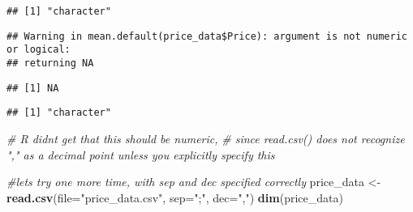 \documentclass[
]{article}
\newenvironment{Shaded}{\begin{snugshade}}{\end{snugshade}}
\newcommand{\AttributeTok}[1]{\textcolor[rgb]{0.13,0.29,0.53}{#1}}
\newcommand{\CommentTok}[1]{\textcolor[rgb]{0.56,0.35,0.01}{\textit{#1}}}
\newcommand{\FunctionTok}[1]{\textcolor[rgb]{0.13,0.29,0.53}{\textbf{#1}}}
\newcommand{\NormalTok}[1]{#1}
\newcommand{\OtherTok}[1]{\textcolor[rgb]{0.56,0.35,0.01}{#1}}
\newcommand{\SpecialCharTok}[1]{\textcolor[rgb]{0.81,0.36,0.00}{\textbf{#1}}}
\newcommand{\StringTok}[1]{\textcolor[rgb]{0.31,0.60,0.02}{#1}}
\begin{document}
\begin{Shaded}
\end{Shaded}

\begin{verbatim}
## [1] "character"
\end{verbatim}

\begin{Shaded}
\end{Shaded}

\begin{verbatim}
## Warning in mean.default(price_data$Price): argument is not numeric or logical:
## returning NA
\end{verbatim}

\begin{verbatim}
## [1] NA
\end{verbatim}

\begin{Shaded}
\end{Shaded}

\begin{verbatim}
## [1] "character"
\end{verbatim}

\begin{Shaded}
\begin{Highlighting}[]
\CommentTok{\# R didn\textquotesingle{}t get that this should be numeric,}
\CommentTok{\# since read.csv() does not recognize "," as a decimal point unless you explicitly specify this}

\CommentTok{\#let\textquotesingle{}s try one more time, with sep and dec specified correctly}
\NormalTok{price\_data }\OtherTok{\textless{}{-}} \FunctionTok{read.csv}\NormalTok{(}\AttributeTok{file=}\StringTok{"price\_data.csv"}\NormalTok{, }\AttributeTok{sep=}\StringTok{";"}\NormalTok{, }\AttributeTok{dec=}\StringTok{","}\NormalTok{)}
\FunctionTok{dim}\NormalTok{(price\_data)}
\end{Highlighting}
\end{Shaded}
\end{document}
